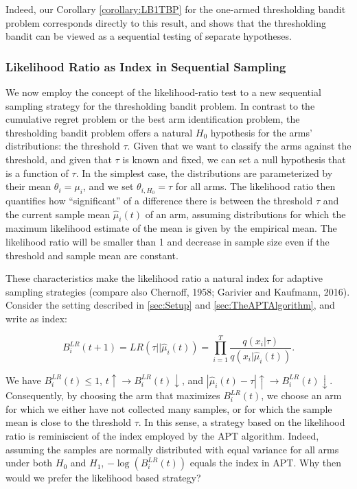 \documentclass[11pt,]{article}
\begin{document}
Indeed, our Corollary \autoref{corollary:LB1TBP} for the one-armed
thresholding bandit problem corresponds directly to this result, and
shows that the thresholding bandit can be viewed as a sequential testing
of separate hypotheses.

\subsubsection{Likelihood Ratio as Index in Sequential
Sampling}\label{likelihood-ratio-as-index-in-sequential-sampling}

We now employ the concept of the likelihood-ratio test to a new
sequential sampling strategy for the thresholding bandit problem. In
contrast to the cumulative regret problem or the best arm identification
problem, the thresholding bandit problem offers a natural \(H_0\)
hypothesis for the arms' distributions: the threshold \(\tau\). Given
that we want to classify the arms against the threshold, and given that
\(\tau\) is known and fixed, we can set a null hypothesis that is a
function of \(\tau\). In the simplest case, the distributions are
parameterized by their mean \(\theta_i = \mu_i\), and we set
\(\theta_{i,H_0} = \tau\) for all arms. The likelihood ratio then
quantifies how ``significant'' of a difference there is between the
threshold \(\tau\) and the current sample mean \(\hat{\mu}_i(t)\) of an
arm, assuming distributions for which the maximum likelihood estimate of
the mean is given by the empirical mean. The likelihood ratio will be
smaller than 1 and decrease in sample size even if the threshold and
sample mean are constant.

These characteristics make the likelihood ratio a natural index for
adaptive sampling strategies (compare also Chernoff, 1958; Garivier and
Kaufmann, 2016). Consider the setting described in \autoref{sec:Setup}
and \autoref{sec:TheAPTAlgorithm}, and write as index:

\[
B_i^{LR}(t+1) = LR(\tau|| \hat{\mu}_i(t)) = \prod_{i=1}^T\frac{q(x_i|\tau)}{ q(x_i|\hat{\mu}_i(t))}.
\]

We have \(B_i^{LR}(t) \leq 1\),
\(t \uparrow \rightarrow B_i^{LR}(t) \downarrow\), and
\(|\hat{\mu}_i(t) - \tau| \uparrow \rightarrow B_i^{LR}(t) \downarrow\).
Consequently, by choosing the arm that maximizes \(B_i^{LR}(t)\), we
choose an arm for which we either have not collected many samples, or
for which the sample mean is close to the threshold \(\tau\). In this
sense, a strategy based on the likelihood ratio is reminiscient of the
index employed by the APT algorithm. Indeed, assuming the samples are
normally distributed with equal variance for all arms under both \(H_0\)
and \(H_1\), \(-\log(B_i^{LR}(t))\) equals the index in APT. Why then
would we prefer the likelihood based strategy?
\end{document}
